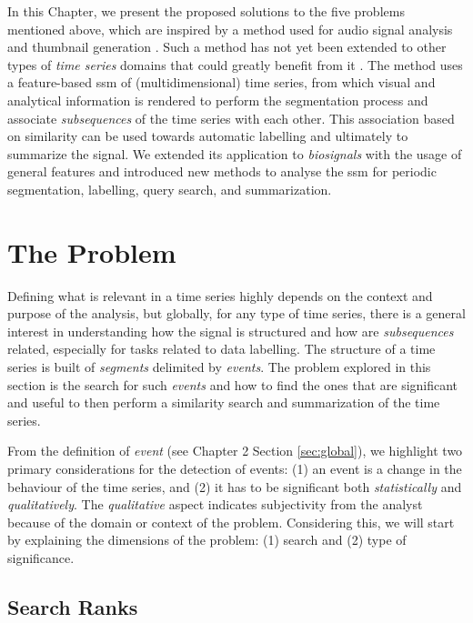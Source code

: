 In this Chapter, we present the proposed solutions to the five problems mentioned above, which are inspired by a method used for audio signal analysis and thumbnail generation \cite{fmp1, audiolabs1, audiolabs2, cpd_audio}. Such a method has not yet been extended to other types of \textit{time series} domains that could greatly benefit from it \cite{muller_music_health}. The method uses a feature-based \gls{ssm} of (multidimensional) time series, from which visual and analytical information is rendered to perform the segmentation process and associate \textit{subsequences} of the time series with each other. This association based on similarity can be used towards automatic labelling and ultimately to summarize the signal. We extended its application to \textit{biosignals} with the usage of general features and introduced new methods to analyse the \gls{ssm} for periodic segmentation, labelling, query search, and summarization.


\section{The Problem}

Defining what is relevant in a time series highly depends on the context and purpose of the analysis, but globally, for any type of time series, there is a general interest in understanding how the signal is structured and how are \textit{subsequences} related, especially for tasks related to data labelling. The structure of a time series is built of \textit{segments} delimited by \textit{events}. The problem explored in this section is the search for such \textit{events} and how to find the ones that are significant and useful to then perform a similarity search and summarization of the time series.
\par
From the definition of \textit{event} (see Chapter 2 Section \ref{sec:global}), we highlight two primary considerations for the detection of events: (1) an event is a change in the behaviour of the time series, and (2) it has to be significant both \textit{statistically} and \textit{qualitatively}. The \textit{qualitative} aspect indicates subjectivity from the analyst because of the domain or context of the problem. Considering this, we will start by explaining the dimensions of the problem: (1) search and (2) type of significance. 

\subsection{Search Ranks}

